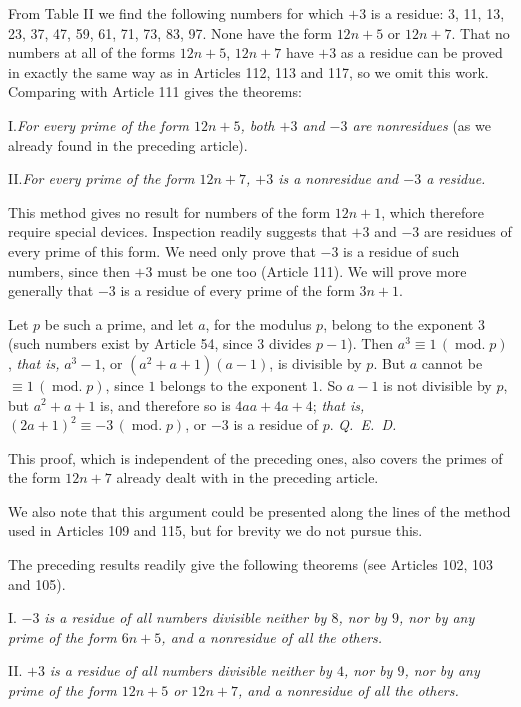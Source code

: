 From Table II we find the following numbers for which $+3$ is a residue: 3, 11, 13, 23, 37, 47, 59, 61, 71, 73, 83, 97. None have the form $12n+5$ or $12n+7$. That no numbers at all of the forms $12n+5$, $12n+7$ have $+3$ as a residue can be proved in exactly the same way as in Articles 112, 113 and 117, so we omit this work. Comparing with Article 111 gives the theorems:

I.\quad \emph{For every prime of the form $12n+5$, both $+3$ and $-3$ are nonresidues} (as we already found in the preceding article).

II.\quad \emph{For every prime of the form $12n+7$, $+3$ is a nonresidue and $-3$ a residue.}

This method gives no result for numbers of the form $12n+1$, which therefore require special devices. Inspection readily suggests that $+3$ and $-3$ are residues of every prime of this form. We need only prove that $-3$ is a residue of such numbers, since then $+3$ must be one too (Article 111). We will prove more generally that $-3$ is a residue of every prime of the form $3n+1$.

Let $p$ be such a prime, and let $a$, for the modulus $p$, belong to the exponent $3$ (such numbers exist by Article 54, since $3$ divides $p-1$). Then $a^3\equiv1\,(\operatorname{mod.}p)$, \emph{that is,} $a^3-1$, or $(a^2+a+1)(a-1)$, is divisible by $p$. But $a$ cannot be $\equiv1\,(\operatorname{mod.}p)$, since $1$ belongs to the exponent $1$. So $a-1$ is not divisible by $p$, but $a^2+a+1$ is, and therefore so is $4aa+4a+4$; \emph{that is,} $(2a+1)^2\equiv-3\,(\operatorname{mod.}p)$, or $-3$ is a residue of $p$. \mbox{\emph{Q. E. D.}}

This proof, which is independent of the preceding ones, also covers the primes of the form $12n+7$ already dealt with in the preceding article.

We also note that this argument could be presented along the lines of the method used in Articles 109 and 115, but for brevity we do not pursue this.

The preceding results readily give the following theorems (see Articles 102, 103 and 105).

I. $-3$ \emph{is a residue of all numbers divisible neither by $8$, nor by $9$, nor by any prime of the form $6n+5$, and a nonresidue of all the others.}

II. $+3$ \emph{is a residue of all numbers divisible neither by $4$, nor by $9$, nor by any prime of the form $12n+5$ or $12n+7$, and a nonresidue of all the others.}

